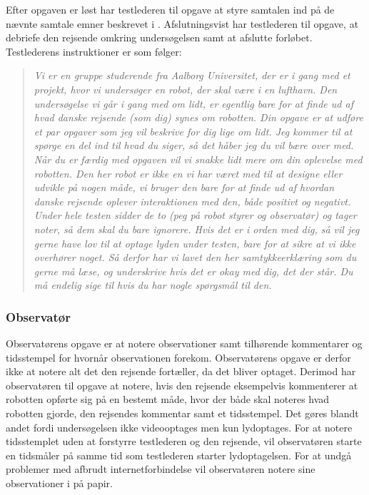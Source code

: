 Efter opgaven er løst har testlederen til opgave at styre samtalen ind på de nævnte samtale emner beskrevet i . Afslutningsvist har testlederen til opgave, at debriefe den rejsende omkring undersøgelsen samt at afslutte forløbet.\blankline
%
Testlederens instruktioner er som følger:
%
\begin{quotation}
\noindent
\textit{Vi er en gruppe studerende fra Aalborg Universitet, der er i gang med et projekt, hvor vi undersøger en robot, der skal være i en lufthavn. Den undersøgelse vi går i gang med om lidt, er egentlig bare for at finde ud af hvad danske rejsende (som dig) synes om robotten.\blankline
%
Din opgave er at udføre et par opgaver som jeg vil beskrive for dig lige om lidt. Jeg kommer til at spørge en del ind til hvad du siger, så det håber jeg du vil bære over med. Når du er færdig med opgaven vil vi snakke lidt mere om din oplevelse med robotten.\blankline  
%
Den her robot er ikke en vi har været med til at designe eller udvikle på nogen måde, vi bruger den bare for at finde ud af hvordan danske rejsende oplever interaktionen med den, både positivt og negativt.\blankline
%
Under hele testen sidder de to (peg på robot styrer og observatør) og tager noter, så dem skal du bare ignorere. \blankline
%
Hvis det er i orden med dig, så vil jeg gerne have lov til at optage lyden under testen, bare for at sikre at vi ikke overhører noget. Så derfor har vi lavet den her samtykkeerklæring som du gerne må læse, og underskrive hvis det er okay med dig, det der står. Du må endelig sige til hvis du har nogle spørgsmål til den.}
\end{quotation}
   

\subsubsection*{Observatør}
Observatørens opgave er at notere observationer samt tilhørende kommentarer og tidsstempel for hvornår observationen forekom. Observatørens opgave er derfor ikke at notere alt det den rejsende fortæller, da det bliver optaget. Derimod har observatøren til opgave at notere, hvis den rejsende eksempelvis kommenterer at robotten opførte sig på en bestemt måde, hvor der både skal noteres hvad robotten gjorde, den rejsendes kommentar samt et tidsstempel. Det gøres blandt andet fordi undersøgelsen ikke videooptages men kun lydoptages. For at notere tidsstemplet uden at forstyrre testlederen og den rejsende, vil observatøren starte en tidsmåler på samme tid som testlederen starter lydoptagelsen. For at undgå problemer med afbrudt internetforbindelse vil observatøren notere sine observationer i på papir.      
 
